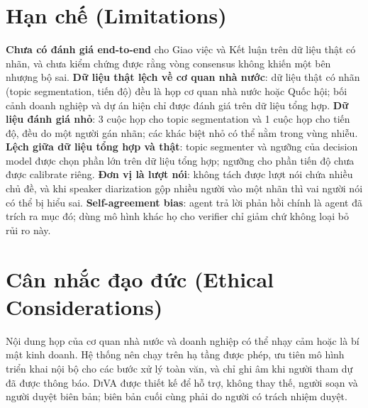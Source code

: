 \documentclass[11pt]{article}
\newcommand{\diva}{\textsc{DiVA}}
\begin{document}
\section*{Hạn chế (Limitations)}

\textbf{Chưa có đánh giá end-to-end} cho Giao việc và Kết luận trên dữ liệu thật có nhãn, và chưa kiểm
chứng được rằng vòng consensus không khiến một bên nhượng bộ sai. \textbf{Dữ liệu thật lệch về cơ quan
nhà nước}: dữ liệu thật có nhãn (topic segmentation, tiến độ) đều là họp cơ quan nhà nước hoặc Quốc hội; bối cảnh
doanh nghiệp và dự án hiện chỉ được đánh giá trên dữ liệu tổng hợp. \textbf{Dữ liệu đánh giá nhỏ}: 3 cuộc
họp cho topic segmentation và 1 cuộc họp cho tiến độ, đều do một người gán nhãn; các khác biệt nhỏ có thể nằm
trong vùng nhiễu. \textbf{Lệch giữa dữ liệu tổng hợp và thật}: topic segmenter và ngưỡng của decision model
được chọn phần lớn trên dữ liệu tổng hợp; ngưỡng cho phần tiến độ chưa được calibrate riêng.
\textbf{Đơn vị là lượt nói}: không tách được lượt nói chứa nhiều chủ đề, và khi speaker diarization gộp
nhiều người vào một nhãn thì vai người nói có thể bị hiểu sai. \textbf{Self-agreement bias}: agent trả
lời phản hồi chính là agent đã trích ra mục đó; dùng mô hình khác họ cho verifier chỉ giảm chứ không
loại bỏ rủi ro này.

\section*{Cân nhắc đạo đức (Ethical Considerations)}

Nội dung họp của cơ quan nhà nước và doanh nghiệp có thể nhạy cảm hoặc là bí mật kinh doanh. Hệ thống nên
chạy trên hạ tầng được phép, ưu tiên mô hình triển khai nội bộ cho các bước xử lý toàn văn, và chỉ ghi âm
khi người tham dự đã được thông báo. \diva{} được thiết kế để hỗ trợ, không thay thế, người soạn và người
duyệt biên bản; biên bản cuối cùng phải do người có trách nhiệm duyệt.


\end{document}
